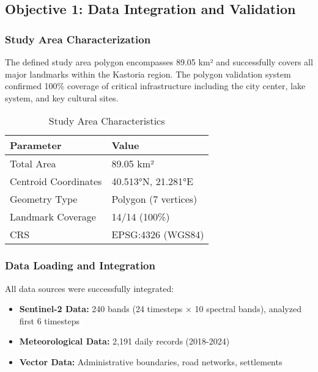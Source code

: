 \documentclass[a4paper,12pt]{article}
\begin{document}
\subsection{Objective 1: Data Integration and Validation}

\subsubsection{Study Area Characterization}

The defined study area polygon encompasses 89.05 km² and successfully covers all
major landmarks within the Kastoria region. The polygon validation system
confirmed 100\% coverage of critical infrastructure including the city center,
lake system, and key cultural sites.

\begin{table}[H]
    \centering
    \caption{Study Area Characteristics}
    \begin{tabular}{@{}ll@{}}
        \toprule
        Parameter            & Value                \\
        \midrule
        Total Area           & 89.05 km²            \\
        Centroid Coordinates & 40.513°N, 21.281°E  \\
        Geometry Type        & Polygon (7 vertices) \\
        Landmark Coverage    & 14/14 (100\%)        \\
        CRS                  & EPSG:4326 (WGS84)    \\
        \bottomrule
    \end{tabular}
\end{table}

\subsubsection{Data Loading and Integration}

All data sources were successfully integrated:

\begin{itemize}
    \item \textbf{Sentinel-2 Data:} 240 bands (24 timesteps × 10 spectral bands), analyzed first 6 timesteps
    \item \textbf{Meteorological Data:} 2,191 daily records (2018-2024)
    \item \textbf{Vector Data:} Administrative boundaries, road networks, settlements
\end{itemize}
\end{document}
